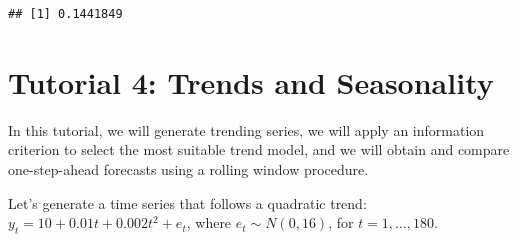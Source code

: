 \documentclass[
  12pt,
  oneside]{book}
\newenvironment{Shaded}{\begin{snugshade}}{\end{snugshade}}
\newcommand{\AttributeTok}[1]{\textcolor[rgb]{0.77,0.63,0.00}{#1}}
\newcommand{\CommentTok}[1]{\textcolor[rgb]{0.56,0.35,0.01}{\textit{#1}}}
\newcommand{\DecValTok}[1]{\textcolor[rgb]{0.00,0.00,0.81}{#1}}
\newcommand{\FloatTok}[1]{\textcolor[rgb]{0.00,0.00,0.81}{#1}}
\newcommand{\FunctionTok}[1]{\textcolor[rgb]{0.00,0.00,0.00}{#1}}
\newcommand{\NormalTok}[1]{#1}
\newcommand{\OtherTok}[1]{\textcolor[rgb]{0.56,0.35,0.01}{#1}}
\newcommand{\SpecialCharTok}[1]{\textcolor[rgb]{0.00,0.00,0.00}{#1}}
\begin{document}
\begin{Shaded}
\end{Shaded}

\begin{verbatim}
## [1] 0.1441849
\end{verbatim}

\hypertarget{tutorial-4-trends-and-seasonality}{%
\chapter*{Tutorial 4: Trends and Seasonality}\label{tutorial-4-trends-and-seasonality}}

In this tutorial, we will generate trending series, we will apply an information criterion to select the most suitable trend model, and we will obtain and compare one-step-ahead forecasts using a rolling window procedure.

Let's generate a time series that follows a quadratic trend: \(y_{t} = 10+0.01t+0.002t^2+e_{t}\), where \(e_{t} \sim N(0,16)\), for \(t=1,\ldots,180\).
\end{document}
